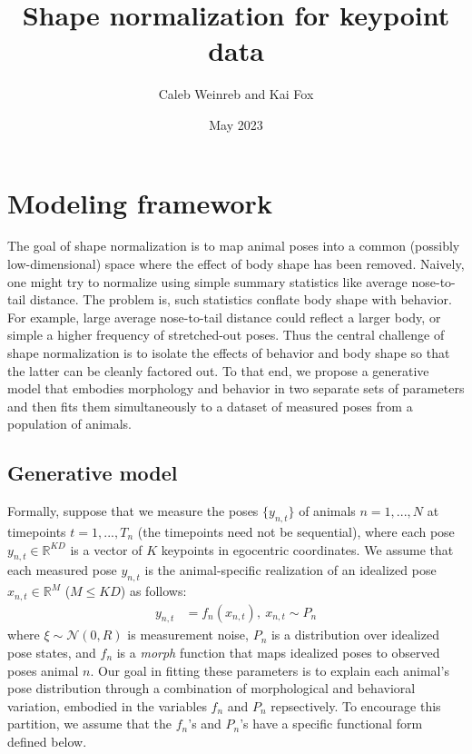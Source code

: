 \documentclass{article}         %
\title{Shape normalization for keypoint data}
\author{Caleb Weinreb and Kai Fox}
\date{May 2023}
\begin{document}
\maketitle

\section{Modeling framework}
\label{sec:model-fwk}

The goal of shape normalization is to map animal poses into a common (possibly low-dimensional) space where the effect of body shape has been removed. Naively, one might try to normalize using simple summary statistics like average nose-to-tail distance. The problem is, such statistics conflate body shape with behavior. For example, large average nose-to-tail distance could reflect a larger body, or simple a higher frequency of stretched-out poses. Thus the central challenge of shape normalization is to isolate the effects of behavior and body shape so that the latter can be cleanly factored out. To that end, we propose a generative model that embodies morphology and behavior in two separate sets of parameters and then fits them simultaneously to a dataset of measured poses from a population of animals.

\subsection{Generative model}

Formally, suppose that we measure the poses $\{y_{n,t}\}$ of animals $n=1,...,N$ at timepoints $t=1,...,T_n$ (the timepoints need not be sequential), where each pose $y_{n, t} \in \mathbb{R}^{KD}$ is a vector of $K$ keypoints in egocentric coordinates. We assume that each measured pose $y_{n,t}$ is the animal-specific realization of an idealized pose $x_{n,t} \in \mathbb{R}^M$ ($M \le KD$) as follows:
%
\begin{align}
    y_{n,t} & = f_n(x_{n,t}), \ x_{n,t} \sim P_n
\end{align}
%
where $\xi \sim \mathcal{N}(0, R)$ is measurement noise, $P_n$ is a distribution over idealized pose states, and $f_n$ is a \textit{morph} function that maps idealized poses to observed poses animal $n$. Our goal in fitting these parameters is to explain each animal's pose distribution through a combination of morphological and behavioral variation, embodied in the variables $f_n$ and $P_n$ repsectively. To encourage this partition, we assume that the $f_n$'s and $P_n$'s have a specific functional form defined below. 
\end{document}
